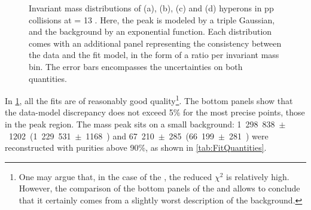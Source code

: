 \begin{figure}[p]
{	\label{fig:OmegaMinus_TripleGaussian}
} 
\caption{Invariant mass distributions of \rmXiM (a), \rmAxiP (b), \rmOmegaM (c) and \rmAomegaP (d) hyperons in pp collisions at \sqrtS = 13 \tev. Here, the peak is modeled by a triple Gaussian, and the background by an exponential function. Each distribution comes with an additional panel representing the consistency between the data and the fit model, in the form of a ratio per invariant mass bin. The error bars encompasses the uncertainties on both quantities.}
	\label{fig:InvMassCascades}
\end{figure}

In \figs\ref{fig:InvMassCascades}, all the fits are of reasonably good quality\footnote{One may argue that, in the case of the \rmXiM, the reduced $\chi^{2}$  is relatively high. However, the comparison of the bottom panels of the \rmXiM and \rmAxiP allows to conclude that it certainly comes from a slightly worst description of the background.}. The bottom panels show that the data-model discrepancy does not exceed 5\% for the most precise points, \ie those in the peak region. The mass peak sits on a small background: 1~298~838~$\pm$~1202~\rmXiM (1~229~531~$\pm$~1168~\rmAxiP) and 67~210~$\pm$~285~\rmOmegaM (66~199~$\pm$~281~\rmAomegaP) were reconstructed with purities above 90\%, as shown in \tab\ref{tab:FitQuantities}.

